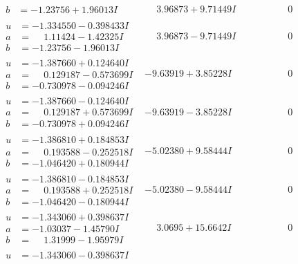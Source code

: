\documentclass[1p]{elsarticle_modified}
\theoremstyle{definition}
\begin{document}
$$\begin{array}{c|c|c}
\begin{aligned}
b &= -1.23756 + 1.96013 I\end{aligned}
 & \phantom{-}3.96873 + 9.71449 I & \phantom{-0.000000 } 0 \\ \hline\begin{aligned}
u &= -1.334550 - 0.398433 I \\
a &= \phantom{-}1.11424 - 1.42325 I \\
b &= -1.23756 - 1.96013 I\end{aligned}
 & \phantom{-}3.96873 - 9.71449 I & \phantom{-0.000000 } 0 \\ \hline\begin{aligned}
u &= -1.387660 + 0.124640 I \\
a &= \phantom{-}0.129187 - 0.573699 I \\
b &= -0.730978 - 0.094246 I\end{aligned}
 & -9.63919 + 3.85228 I & \phantom{-0.000000 } 0 \\ \hline\begin{aligned}
u &= -1.387660 - 0.124640 I \\
a &= \phantom{-}0.129187 + 0.573699 I \\
b &= -0.730978 + 0.094246 I\end{aligned}
 & -9.63919 - 3.85228 I & \phantom{-0.000000 } 0 \\ \hline\begin{aligned}
u &= -1.386810 + 0.184853 I \\
a &= \phantom{-}0.193588 - 0.252518 I \\
b &= -1.046420 + 0.180944 I\end{aligned}
 & -5.02380 + 9.58444 I & \phantom{-0.000000 } 0 \\ \hline\begin{aligned}
u &= -1.386810 - 0.184853 I \\
a &= \phantom{-}0.193588 + 0.252518 I \\
b &= -1.046420 - 0.180944 I\end{aligned}
 & -5.02380 - 9.58444 I & \phantom{-0.000000 } 0 \\ \hline\begin{aligned}
u &= -1.343060 + 0.398637 I \\
a &= -1.03037 - 1.45790 I \\
b &= \phantom{-}1.31999 - 1.95979 I\end{aligned}
 & \phantom{-}3.0695 + 15.6642 I & \phantom{-0.000000 } 0 \\ \hline\begin{aligned}
u &= -1.343060 - 0.398637 I \\

\end{aligned}
\end{array}$$
\end{document}

